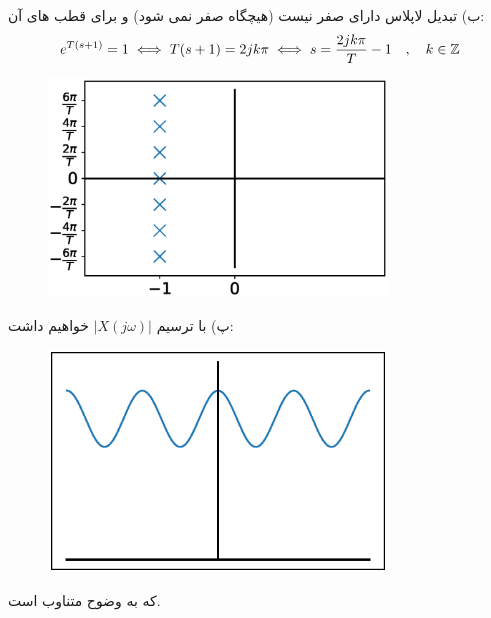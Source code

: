 \documentclass[10pt,letterpaper]{article}
\begin{document}
ب) تبدیل لاپلاس دارای صفر نیست (هیچگاه صفر نمی شود) و برای قطب های آن:
$$
e^{T(s+1)}=1\iff T(s+1)=2jk\pi \iff s={2jk\pi\over T}-1 \quad,\quad k\in\Bbb Z
$$
\begin{figure}[h!]
\centering
\includegraphics[width=90mm]{PSol11_Q11.eps}
\end{figure}

پ) با ترسیم 
$
|X(j\omega)|
$
خواهیم داشت:
\begin{figure}[h!]
\centering
\includegraphics[width=90mm]{PSol11_Q11_2.eps}
\end{figure}

که به وضوح متناوب است.
\end{document}

